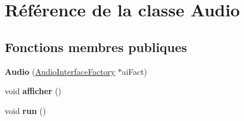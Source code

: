 \hypertarget{classAudio}{\section{Référence de la classe Audio}
\label{classAudio}
}
\subsection*{Fonctions membres publiques}
\begin{DoxyCompactItemize}
\item 
\hypertarget{classAudio_acce28b8dbf321b14405f2ccd244dc4b5}{{\bfseries Audio} (\hyperlink{classAudioInterfaceFactory}{Audio\+Interface\+Factory} $\ast$ai\+Fact)}\label{classAudio_acce28b8dbf321b14405f2ccd244dc4b5}

\item 
\hypertarget{classAudio_ae2e9ae249650dbce7d4a3511dda53a55}{void {\bfseries afficher} ()}\label{classAudio_ae2e9ae249650dbce7d4a3511dda53a55}

\item 
\hypertarget{classAudio_ab4cb3dc5718af3ea91d12b8b54038741}{void {\bfseries run} ()}\label{classAudio_ab4cb3dc5718af3ea91d12b8b54038741}


\end{DoxyCompactItemize}
